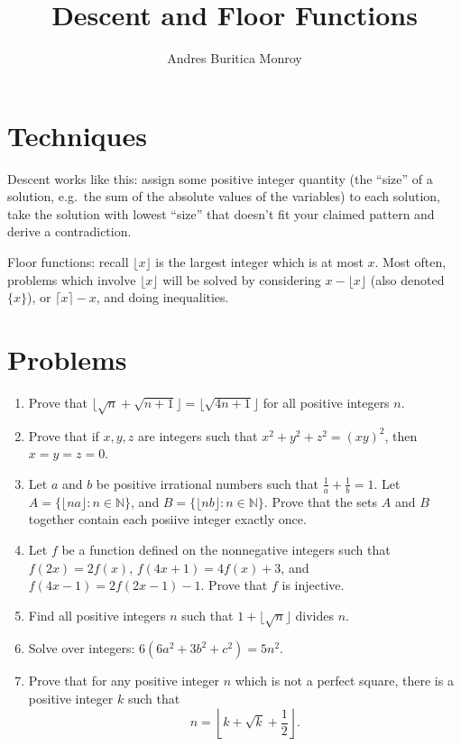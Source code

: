 \documentclass{article}
\title{Descent and Floor Functions}
\author{Andres Buritica Monroy}
\date{}
\begin{document}
\maketitle
\section{Techniques}
Descent works like this: assign some positive integer quantity
(the ``size'' of a solution, e.g.\ the sum of the absolute values of the
variables) to each solution, take the solution with lowest
``size'' that doesn't fit your claimed pattern and derive a contradiction.

Floor functions: recall $\lfloor x\rfloor$ is the largest integer which is at
most $x$. Most often, problems which involve $\lfloor x\rfloor$ will be
solved by considering $x-\lfloor x\rfloor$ (also denoted $\{x\}$), or $\lceil
	x\rceil-x$, and doing inequalities.
\section{Problems}
\begin{enumerate}
	\item Prove that $\lfloor\sqrt n+\sqrt{n+1}\rfloor=\lfloor\sqrt{4n+1}\rfloor$ for all
	      positive integers $n$.
	\item Prove that if $x, y, z$ are integers such that $x^2+y^2+z^2=(xy)^2$,
	      then $x=y=z=0$.
	\item Let $a$ and $b$ be positive irrational numbers such that $\frac 1a+\frac 1b=1$.
	      Let $A=\{\lfloor na\rfloor: n\in\mathbb N\}$, and $B=\{\lfloor nb\rfloor:
		      n\in\mathbb N\}$. Prove that the sets $A$ and $B$ together contain each
	      posiive integer exactly once.
	\item Let $f$ be a function defined on the nonnegative integers such that
	      $f(2x)=2f(x)$, $f(4x+1)=4f(x)+3$, and $f(4x-1)=2f(2x-1)-1$. Prove that $f$
	      is injective.
	\item Find all positive integers $n$ such that $1+\lfloor\sqrt n\rfloor$
	      divides $n$.
	\item Solve over integers: $6(6a^2 + 3b^2 + c^2) = 5n^2$.
	\item Prove that for any positive integer $n$ which is not a perfect square,
	      there is a positive integer $k$ such that
	      \[n=\left\lfloor k+\sqrt k+\frac12\right\rfloor.\]
\end{enumerate}
\newpage
\end{document}

